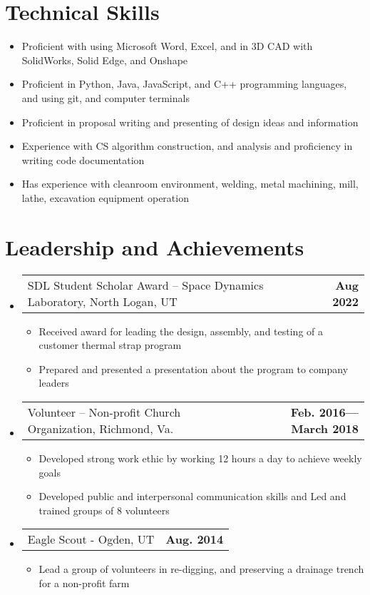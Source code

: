 \documentclass[letterpaper,11pt]{article}
\makeatletter
\newcommand{\resumeProjectHeading}[2]{
    \vspace{-6pt}
    \item
    \begin{tabular*}{1.0\textwidth}{l@{\extracolsep{\fill}}r}
      \small#1 & \textbf{\small #2}\\
    \end{tabular*}\vspace{-11pt}
}
\newcommand{\resumeSubHeadingListStart}{\begin{itemize}[leftmargin=0.0in, label={}]}
\newcommand{\resumeSubHeadingListEnd}{\end{itemize}}
\newcommand{\resumeItemListStart}{\begin{itemize}}
\newcommand{\resumeItemListEnd}{\end{itemize}\vspace{-5pt}}
\newcommand{\resumeItem}[1]{ 
  \item\small{
    {#1 \vspace{-5pt}}
  }
}
\makeatother
\begin{document}
\section{Technical Skills}
    \resumeItemListStart
        \resumeItem {Proficient with using Microsoft Word, Excel, and in 3D CAD with SolidWorks, Solid Edge, and Onshape} \vspace{-4.5pt}
        \resumeItem {Proficient in Python, Java, JavaScript, and C++ programming languages, and using git, and computer terminals} \vspace{-4.5pt}
        \resumeItem {Proficient in proposal writing and presenting of design ideas and information} \vspace{-4.5pt}
        \resumeItem {Experience with CS algorithm construction, and analysis and proficiency in writing code documentation} \vspace{-4.5pt}
        \resumeItem {Has experience with cleanroom environment, welding, metal machining, mill, lathe, excavation equipment operation} \vspace{-4.5pt}

    \resumeItemListEnd
 
\vspace{-8pt}

\section{Leadership and Achievements }
    \resumeSubHeadingListStart
    \resumeProjectHeading
      {SDL Student Scholar Award – Space Dynamics Laboratory, North Logan, UT	}{Aug 2022}
      \resumeItemListStart
        \resumeItem{Received award for leading the design, assembly, and testing of a customer thermal strap program}
        \resumeItem{Prepared and presented a presentation about the program to company leaders}
      \resumeItemListEnd
    \resumeProjectHeading
      {Volunteer – Non-profit Church Organization, Richmond, Va.}{Feb. 2016—March 2018}
      \resumeItemListStart
        \resumeItem{Developed strong work ethic by working 12 hours a day to achieve weekly goals}
        \resumeItem{Developed public and interpersonal communication skills and Led and trained groups of 8 volunteers}
      \resumeItemListEnd
    \resumeProjectHeading
      {Eagle Scout - Ogden, UT}{Aug. 2014}
      \resumeItemListStart
        \resumeItem{Lead a group of volunteers in re-digging, and preserving a drainage trench for a non-profit farm}
      \resumeItemListEnd

    \resumeSubHeadingListEnd
\vspace{-16pt}
\end{document}
